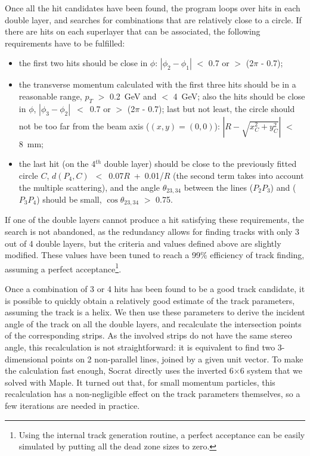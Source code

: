 Once all the hit candidates have been found, the program loops over hits in each 
double layer, and searches for combinations that are relatively close to a circle. 
If there are hits on each superlayer that can be associated, the following 
requirements have to be fulfilled:

\begin{itemize}
\item the first two hits should be close in $\phi$: $|\phi_2-\phi_1|$ $<$ 0.7 or 
$>$ (2$\pi$ - 0.7);
\item the transverse momentum calculated with the first three hits should be in a 
reasonable range, $p_T$ $>$ 0.2~GeV and $<$ 4~GeV; also the hits should be close in 
$\phi$, \mbox{$|\phi_3-\phi_2|$ $<$ 0.7} or $>$ (2$\pi$ - 0.7); last but not least, 
the circle should not be too far from the beam axis ($(x,y)=(0,0)$): 
$|R-\sqrt{x_C^2+y_C^2}|$ $<$ 8~mm;
\item the last hit (on the 4$^{th}$ double layer) should be close to the previously 
fitted circle $C$, \mbox{$d(P_4,C)$ $<$ 0.07$R$ + 0.01/$R$} (the second term takes 
into account the multiple scattering), and the angle $\theta_{23,34}$ between the 
lines ($P_2P_3$) and ($P_3P_4$) should be small, $\cos{\theta_{23,34}}$ $>$ 0.75.
\end{itemize}

If one of the double layers cannot produce a hit satisfying these requirements, the 
search is not abandoned, as the redundancy allows for finding tracks with only 3 out 
of 4 double layers, but the criteria and values defined above are slightly modified. 
These values have been tuned to reach a 99\% efficiency of track finding, assuming a 
perfect acceptance\footnote{Using the internal track generation routine, a perfect 
acceptance can be easily simulated by putting all the dead zone sizes to zero.}.

Once a combination of 3 or 4 hits has been found to be a good track candidate, it 
is possible to quickly obtain a relatively good estimate of the track parameters, 
assuming the track is a helix.  We then use these parameters to derive the incident 
angle of the track on all the double layers, and recalculate the intersection points 
of the corresponding strips.  As the involved strips do not have the same stereo 
angle, this recalculation is not straightforward: it is equivalent to find two 
3-dimensional points on 2 non-parallel lines, joined by a given unit vector.  To 
make the calculation fast enough, Socrat directly uses the inverted 6$\times$6 system 
that we solved with Maple.  It turned out that, for small momentum particles, this 
recalculation has a non-negligible effect on the track parameters themselves, so a 
few iterations are needed in practice.

